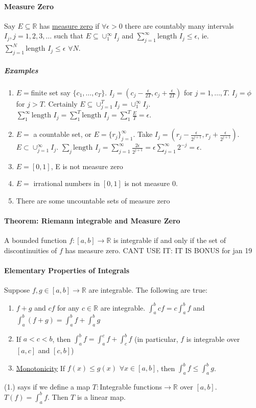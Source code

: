 \documentclass[10pt,letter]{article}
\begin{document}
\paragraph{Measure Zero}
Say $E\subseteq\mathbb{R}$ has \underline{measure zero} if $\forall\epsilon>0$ there are countably many intervals $I_j,j=1,2,3,\ldots$ such that $E\subseteq\cup_1^\infty I_j$ and $\sum_{j=1}^\infty\text{length }I_j\leq\epsilon$, ie. $\sum_{j=1}^N\text{length }I_j\leq\epsilon$ $\forall N$. 
\subparagraph{Examples}
\begin{enumerate}
    \item $E=$finite set say $\{c_1,\ldots,c_T\}$. $I_j=(c_j-\frac{\epsilon}{2T},c_j+\frac{\epsilon}{2T})$ for $j=1,\ldots,T$. $I_j=\phi$ for $j>T$. Certainly $E\subseteq\cup_{j=1}^TI_j=\cup_1^\infty I_j$. $\sum_1^\infty\text{length }I_j=\sum_{1}^T\text{length }I_j=\sum_1^T\frac{E}{T}=\epsilon$.
    \item $E=$ a countable set, or $E=\{r_j\}_{j=1}^\infty$. Take $I_j=(r_j-\frac{\epsilon}{2^{j+1}},r_j+\frac{\epsilon}{2^{j+1}})$. $E\subset\cup_{j=1}^\infty I_j$. $\sum_j\text{length }I_j=\sum_{j=1}^\infty\frac{2\epsilon}{2^{j+1}}=\epsilon\sum_{j=1}^\infty 2^{-j}=\epsilon$. 
    \item $E=[0,1]$, E is not measure zero
    \item $E=$ irrational numbers in $[0,1]$ is not measure 0.
    \item There are some uncountable sets of measure zero 
\end{enumerate}

\paragraph{Theorem: Riemann integrable and Measure Zero}
A bounded function $f:[a,b]\rightarrow\mathbb{R}$ is integrable if and only if the set of discontinuities of $f$ has measure zero. CANT USE IT: IT IS BONUS for jan 19

\paragraph{Elementary Properties of Integrals}
Suppose $f,g\in[a,b]\rightarrow\mathbb{R}$ are integrable. The following are true: 
\begin{enumerate}
    \item $f+g$ and $cf$ for any $c\in\mathbb{R}$ are integrable. $\int_a^bcf=c\int_a^bf$ and $\int_a^b(f+g)=\int_a^bf+\int_a^bg$
    \item If $a<c<b$, then $\int_a^bf=\int_a^cf+\int_c^bf$ (in particular, $f$ is integrable over $[a,c]$ and $[c,b]$)
    \item \underline{Monotonicity} If $f(x)\leq g(x)$ $\forall x\in[a,b]$, then $\int_a^bf\leq\int_a^bg$.
\end{enumerate}
(1.) says if we define a map $T:$Integrable functions$\rightarrow\mathbb{R}$ over $[a,b]$. $T(f)=\int_a^bf$. Then $T$ is a linear map. \\ 
\end{document}
